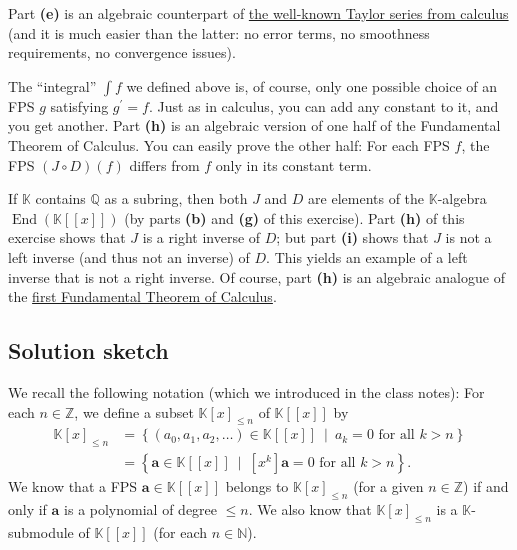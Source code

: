 \documentclass[paper=a4, fontsize=12pt]{scrartcl}%
\theoremstyle{plainsl}
\theoremstyle{definition}
\theoremstyle{remark}
\begin{document}
Part \textbf{(e)} is an algebraic counterpart of
\href{https://en.wikipedia.org/wiki/Taylor_series}{the well-known Taylor
series from calculus} (and it is much easier than the latter: no error terms,
no smoothness requirements, no convergence issues).

The ``integral'' $\int f$ we defined above is, of course, only one possible
choice of an FPS $g$ satisfying $g^{\prime}= f$. Just as in calculus, you can
add any constant to it, and you get another. Part \textbf{(h)} is an algebraic
version of one half of the Fundamental Theorem of Calculus. You can easily
prove the other half: For each FPS $f$, the FPS $\left(  J \circ D \right)
\left(  f \right)  $ differs from $f$ only in its constant term.

If $\mathbb{K}$ contains $\mathbb{Q}$ as a subring, then both $J$ and $D$ are
elements of the $\mathbb{K}$-algebra $\operatorname{End}\left(  \mathbb{K}%
\left[  \left[  x\right]  \right]  \right)  $ (by parts \textbf{(b)} and
\textbf{(g)} of this exercise). Part \textbf{(h)} of this exercise shows that
$J$ is a right inverse of $D$; but part \textbf{(i)} shows that $J$ is not a
left inverse (and thus not an inverse) of $D$. This yields an example of a
left inverse that is not a right inverse. Of course, part \textbf{(h)} is an
algebraic analogue of the
\href{https://en.wikipedia.org/wiki/Fundamental_theorem_of_calculus#First_part}{first
Fundamental Theorem of Calculus}.

\subsection{Solution sketch}

We recall the following notation (which we introduced in the class notes): For
each $n\in\mathbb{Z}$, we define a subset $\mathbb{K}\left[  x\right]  _{\leq
n}$ of $\mathbb{K}\left[  \left[  x\right]  \right]  $ by%
\begin{align*}
\mathbb{K}\left[  x\right]  _{\leq n}  &  =\left\{  \left(  a_{0},a_{1}%
,a_{2},\ldots\right)  \in\mathbb{K}\left[  \left[  x\right]  \right]
\ \mid\ a_{k}=0\text{ for all }k>n\right\} \\
&  =\left\{  \mathbf{a}\in\mathbb{K}\left[  \left[  x\right]  \right]
\ \mid\ \left[  x^{k}\right]  \mathbf{a}=0\text{ for all }k>n\right\}  .
\end{align*}
We know that a FPS $\mathbf{a}\in\mathbb{K}\left[  \left[  x\right]  \right]
$ belongs to $\mathbb{K}\left[  x\right]  _{\leq n}$ (for a given
$n\in\mathbb{Z}$) if and only if $\mathbf{a}$ is a polynomial of degree $\leq
n$. We also know that $\mathbb{K}\left[  x\right]  _{\leq n}$ is a
$\mathbb{K}$-submodule of $\mathbb{K}\left[  \left[  x\right]  \right]  $ (for
each $n\in\mathbb{N}$).
\end{document}
